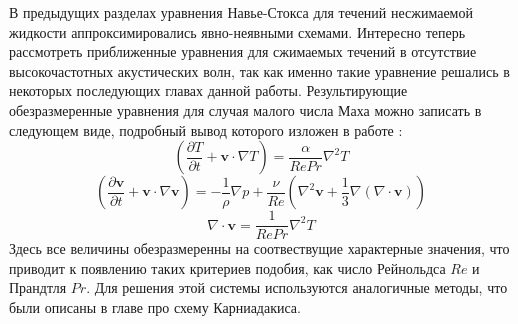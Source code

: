 В предыдущих разделах уравнения Навье-Стокса для течений несжимаемой жидкости аппроксимировались 
явно-неявными схемами. 
%
Интересно теперь рассмотреть приближенные уравнения для сжимаемых течений в отсутствие высокочастотных 
акустических волн, так как именно такие уравнение решались в некоторых последующих главах данной работы.
%
Результирующие обезразмеренные уравнения для случая малого числа Маха можно записать в следующем виде,
подробный вывод которого изложен в работе \cite{tomboulides1997numerical}:
%
\begin{equation}\label{eq:lowmach1} 
    (\frac{\partial T}{\partial t} + \textbf{v} \cdot \nabla T) = \frac{\alpha}{RePr}
    \nabla^2 T
\end{equation}   
\begin{equation}\label{eq:lowmach2} 
    (\frac{\partial \textbf{v}}{\partial t} + \textbf{v} \cdot \nabla \textbf{v}) = 
    - \frac{1}{\rho} \nabla p + \frac{\nu}{Re} (\nabla^2 \textbf{v}
    + \frac{1}{3}\nabla(\nabla \cdot \textbf{v}))
\end{equation}   
\begin{equation}\label{eq:lowmach3} 
    \nabla \cdot \textbf{v} = \frac{1}{RePr} \nabla^2 T
\end{equation}   
%
Здесь все величины обезразмеренны на соотвествущие характерные значения, что приводит к появлению таких критериев
подобия, как число Рейнольдса $Re$ и Прандтля $Pr$.
%
Для решения этой системы используются аналогичные методы, что были описаны в главе про схему Карниадакиса.









